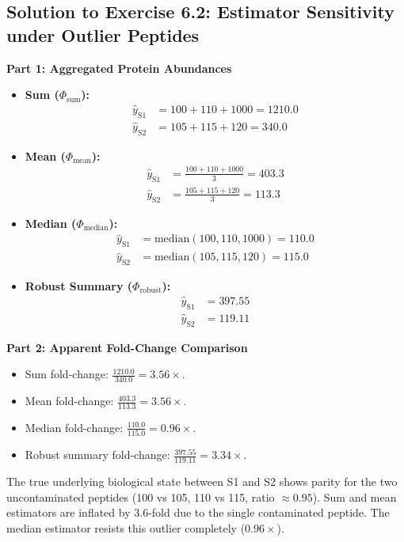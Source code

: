\documentclass[11pt,twoside,openright]{book}
\begin{document}
\subsection{Solution to Exercise 6.2: Estimator Sensitivity under Outlier Peptides}
\noindent\textbf{Part 1: Aggregated Protein Abundances}\enspace
\begin{itemize}
    \item \textbf{Sum ($\Phi_{\text{sum}}$):}
    \begin{align}
    \hat{y}_{\text{S1}} &= 100 + 110 + 1000 = 1210.0 \\
    \hat{y}_{\text{S2}} &= 105 + 115 + 120 = 340.0
    \end{align}
    \item \textbf{Mean ($\Phi_{\text{mean}}$):}
    \begin{align}
    \hat{y}_{\text{S1}} &= \frac{100 + 110 + 1000}{3} = 403.3 \\
    \hat{y}_{\text{S2}} &= \frac{105 + 115 + 120}{3} = 113.3
    \end{align}
    \item \textbf{Median ($\Phi_{\text{median}}$):}
    \begin{align}
    \hat{y}_{\text{S1}} &= \text{median}(100, 110, 1000) = 110.0 \\
    \hat{y}_{\text{S2}} &= \text{median}(105, 115, 120) = 115.0
    \end{align}
    \item \textbf{Robust Summary ($\Phi_{\text{robust}}$):}
    \begin{align}
    \hat{y}_{\text{S1}} &= 397.55 \\
    \hat{y}_{\text{S2}} &= 119.11
    \end{align}
\end{itemize}

\noindent\textbf{Part 2: Apparent Fold-Change Comparison}\enspace
\begin{itemize}
    \item Sum fold-change: $\frac{1210.0}{340.0} = 3.56\times$.
    \item Mean fold-change: $\frac{403.3}{113.3} = 3.56\times$.
    \item Median fold-change: $\frac{110.0}{115.0} = 0.96\times$.
    \item Robust summary fold-change: $\frac{397.55}{119.11} = 3.34\times$.
\end{itemize}
The true underlying biological state between S1 and S2 shows parity for the two uncontaminated peptides (100 vs 105, 110 vs 115, ratio $\approx 0.95$). Sum and mean estimators are inflated by $3.6$-fold due to the single contaminated peptide. The median estimator resists this outlier completely ($0.96\times$).
\end{document}
